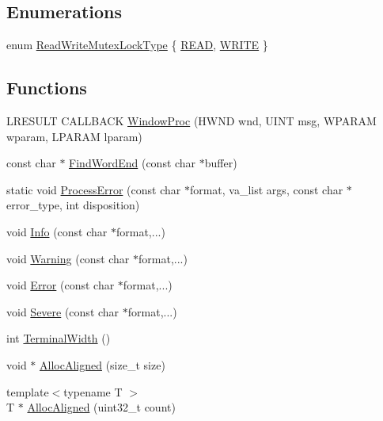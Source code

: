 \subsection*{Enumerations}
\begin{DoxyCompactItemize}
\item 
enum \hyperlink{namespacemage_afd76fcca37ce5c5b2227671290973c74}{Read\+Write\+Mutex\+Lock\+Type} \{ \hyperlink{namespacemage_afd76fcca37ce5c5b2227671290973c74a384918b13691984406aeb754f1c454d0}{R\+E\+AD}, 
\hyperlink{namespacemage_afd76fcca37ce5c5b2227671290973c74aff9d196f4bda4079f3f1ce90bd644662}{W\+R\+I\+TE}
 \}
\end{DoxyCompactItemize}
\subsection*{Functions}
\begin{DoxyCompactItemize}
\item 
L\+R\+E\+S\+U\+LT C\+A\+L\+L\+B\+A\+CK \hyperlink{namespacemage_a3b7426a2b3c10a52791dac481c2495a3}{Window\+Proc} (H\+W\+ND wnd, U\+I\+NT msg, W\+P\+A\+R\+AM wparam, L\+P\+A\+R\+AM lparam)
\item 
const char $\ast$ \hyperlink{namespacemage_ab2e62d950dc620167f4128cb16033998}{Find\+Word\+End} (const char $\ast$buffer)
\item 
static void \hyperlink{namespacemage_a0325f02cf9fd84c5b61ff249630fb0cd}{Process\+Error} (const char $\ast$format, va\+\_\+list args, const char $\ast$error\+\_\+type, int disposition)
\item 
void \hyperlink{namespacemage_add6aa5f13960ce07b20f48d273956a91}{Info} (const char $\ast$format,...)
\item 
void \hyperlink{namespacemage_a0eccd8065c75d5f2bf86b48a5be3bfe5}{Warning} (const char $\ast$format,...)
\item 
void \hyperlink{namespacemage_a52a7fe8c9ce39afd9e0b0299373db0fa}{Error} (const char $\ast$format,...)
\item 
void \hyperlink{namespacemage_a95c8b0820c579bbde59062fd9d05e4f4}{Severe} (const char $\ast$format,...)
\item 
int \hyperlink{namespacemage_a0c12a51bf3468b372932ffc1138a4ddc}{Terminal\+Width} ()
\item 
void $\ast$ \hyperlink{namespacemage_a7d706913bb9fb322c938cd3e4d8eaede}{Alloc\+Aligned} (size\+\_\+t size)
\item 
{\footnotesize template$<$typename T $>$ }\\T $\ast$ \hyperlink{namespacemage_ae2f31ba64620694aa0dfc8ca6e5d5941}{Alloc\+Aligned} (uint32\+\_\+t count)

\end{DoxyCompactItemize}
